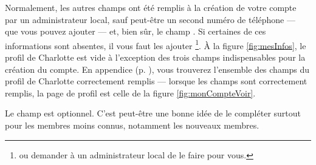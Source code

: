 Normalement, les autres champs ont été remplis à la création de votre compte par un administrateur local, sauf peut-être un second numéro de téléphone --- que vous pouvez ajouter --- et, bien sûr, le champ . Si certaines de ces informations sont absentes, il vous faut les ajouter
\footnote{ou demander à un administrateur local de le faire pour vous.}. 
À la figure \ref{fig:mesInfos}, le profil de Charlotte est vide à l'exception des trois champs indispensables pour la création du compte. En appendice (p. \pageref{fig:profilCharlotteComplet}), vous trouverez l'ensemble des champs du profil de Charlotte correctement remplis --- lorsque les champs sont correctement remplis, la page de profil est celle de la figure \vref{fig:monCompteVoir}.

Le champ  est optionnel. C'est peut-être une bonne idée de le compléter surtout pour les membres moins connus, notamment les nouveaux membres.

